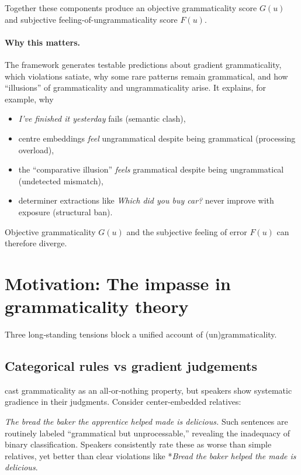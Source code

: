 \documentclass[12pt]{article}
\begin{document}
Together these components produce an objective grammaticality score \(G(u)\) and subjective feeling-of-ungrammaticality score \(F(u)\).

\paragraph*{Why this matters.}
The framework generates testable predictions about gradient grammaticality, which violations satiate, why some rare patterns remain grammatical, and how \enquote{illusions} of grammaticality and ungrammaticality arise. It explains, for example, why
\begin{itemize}
    \item \textit{I've finished it yesterday} fails (semantic clash),  
    \item centre embeddings \emph{feel} ungrammatical despite being grammatical (processing overload),
    \item the \enquote{comparative illusion} \emph{feels} grammatical despite being ungrammatical (undetected mismatch),
    \item determiner extractions like \textit{Which did you buy car?} never improve with exposure (structural ban).
\end{itemize}
Objective grammaticality \(G(u)\) and the subjective feeling of error \(F(u)\) can therefore diverge.

\section{Motivation: The impasse in grammaticality theory}

Three long‑standing tensions block a unified account of (un)grammaticality.

\subsection{Categorical rules vs gradient judgements}

\textcite{chomsky1957} cast grammaticality as an all‑or‑nothing property, but speakers show systematic gradience in their judgments. Consider center-embedded relatives:

\ea
\textit{The bread the baker the apprentice helped made is delicious.}
\z
Such sentences are routinely labeled \enquote{grammatical but unprocessable,} revealing the inadequacy of binary classification. Speakers consistently rate these as worse than simple relatives, yet better than clear violations like *\textit{Bread the baker helped the made is delicious}. 
\end{document}
